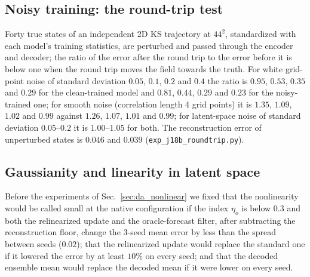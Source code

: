 \begin{table}[htbp]
\caption{1D KS data assimilation after transfer: steady-state skill
(free-run error over analysis error, cycles 51--100) at a fixed
observation spacing of $3.125$, model trained at $L=100$, for the
Gauss--Newton particle flow filter (GN-PFF), the kernel particle flow
filter (kPFF, $\alpha=0.1$) and the stochastic ensemble Kalman filter (EnKF).
Pairs: no localization / Gaspari--Cohn (half-width 3 sites). Last two columns
($L=200$ only): sampling error correction with the GN-PFF
after projection onto the PSD cone, and in a serial ensemble Kalman
filter. Skill below 1 means the filter is worse than no assimilation.}
\label{tab:da_1d}
\end{table}


\subsection{Noisy training: the round-trip test}
\label{app:da_roundtrip}

Forty true states of an independent 2D KS trajectory at $44^2$, standardized with each model's training
statistics, are perturbed and passed through the encoder and decoder; the ratio of the error after the
round trip to the error before it is below one when the round trip moves the field towards the truth.
For white grid-point noise of standard deviation $0.05$, $0.1$, $0.2$ and $0.4$ the ratio is $0.95$, $0.53$, $0.35$
and $0.29$ for the clean-trained model and $0.81$, $0.44$, $0.29$ and $0.23$ for the noisy-trained one; for
smooth noise (correlation length 4 grid points) it is $1.35$, $1.09$, $1.02$ and $0.99$ against $1.26$, $1.07$,
$1.01$ and $0.99$; for latent-space noise of standard deviation $0.05$--$0.2$ it is $1.00$--$1.05$ for both. The
reconstruction error of unperturbed states is $0.046$ and $0.039$ (\texttt{exp\_j18b\_roundtrip.py}).

\subsection{Gaussianity and linearity in latent space}
\label{app:da_gauss}

 Before the experiments of
Sec.~\ref{sec:da_nonlinear} we fixed that the nonlinearity would be called
small at the native configuration if the index $\eta_o$ is below $0.3$ and both
the relinearized update and the oracle-forecast filter, after subtracting
the reconstruction floor, change the 3-seed mean error by less than the
spread between seeds ($0.02$); that the relinearized update would replace
the standard one if it lowered the error by at least $10\%$ on every seed;
and that the decoded ensemble mean would replace the decoded mean if it
were lower on every seed.

